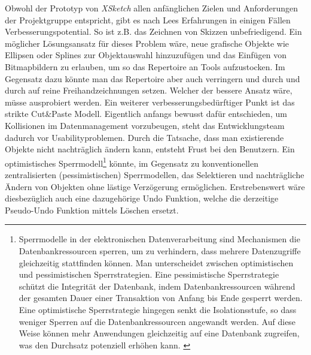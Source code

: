 \medskip Obwohl der Prototyp von \emph{XSketch} allen anfänglichen Zielen und Anforderungen der Projektgruppe entspricht, gibt es nach Lees Erfahrungen in einigen Fällen Verbesserungspotential. So ist z.B. das Zeichnen von Skizzen unbefriedigend. Ein möglicher Lösungsansatz für dieses Problem wäre, neue grafische Objekte wie Ellipsen oder Splines zur Objektauswahl hinzuzufügen und das Einfügen von Bitmapbildern zu erlauben, um so das Repertoire an Tools aufzustocken. Im Gegensatz dazu könnte man das Repertoire aber auch verringern und durch und durch auf reine Freihandzeichnungen setzen. Welcher der bessere Ansatz wäre, müsse ausprobiert werden.
Ein weiterer verbesserungsbedürftiger Punkt ist das strikte Cut\&Paste Modell. Eigentlich anfangs bewusst dafür entschieden, um Kollisionen im Datenmanagement vorzubeugen, steht das Entwicklungsteam dadurch vor Usabilityproblemen. Durch die Tatsache, dass man existierende Objekte nicht nachträglich ändern kann, entsteht Frust bei den Benutzern. Ein optimistisches Sperrmodell\footnote{Sperrmodelle in der elektronischen Datenverarbeitung sind Mechanismen die Datenbankressourcen sperren, um zu verhindern, dass mehrere Datenzugriffe gleichzeitig stattfinden können. Man unterscheidet zwischen optimistischen und pessimistischen Sperrstrategien. Eine pessimistische Sperrstrategie schützt die Integrität der Datenbank, indem Datenbankressourcen während der gesamten Dauer einer Transaktion von Anfang bis Ende gesperrt werden. Eine optimistische Sperrstrategie hingegen senkt die Isolationsstufe, so dass weniger Sperren auf die Datenbankressourcen angewandt werden. Auf diese Weise können mehr Anwendungen gleichzeitig auf eine Datenbank zugreifen, was den Durchsatz potenziell erhöhen kann. \citep{IBM:1996:Online}} könnte, im Gegensatz zu konventionellen zentralisierten (pessimistischen) Sperrmodellen, das Selektieren und nachträgliche Ändern von Objekten ohne lästige Verzögerung ermöglichen. Erstrebenswert wäre diesbezüglich auch eine dazugehörige Undo Funktion, welche die derzeitige Pseudo-Undo Funktion mittels Löschen ersetzt.
